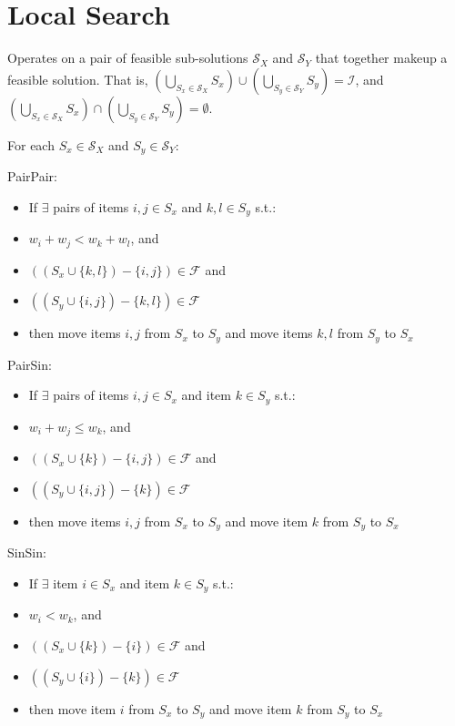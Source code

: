 \documentclass{elsarticle}
\begin{document}
\section{Local Search}
Operates on a pair of feasible sub-solutions $\mathcal{S}_X$ and $\mathcal{S}_Y$ that together makeup a feasible solution. That is, $(\bigcup_{S_x \in \mathcal{S}_X} S_x) \cup (\bigcup_{S_y \in \mathcal{S}_Y} S_y) = \mathcal{I}$, and $(\bigcup_{S_x \in \mathcal{S}_X} S_x) \cap (\bigcup_{S_y \in \mathcal{S}_Y} S_y) = \emptyset$.

For each $S_x \in \mathcal{S}_X$ and $S_y \in \mathcal{S}_Y$:

PairPair:
\begin{itemize}
	\item If $\exists$ pairs of items $i,j \in S_x$ and $k, l \in S_y$ s.t.:
	\item $w_i + w_j < w_k + w_l$, and
	\item $((S_x \cup \{k, l\}) - \{i, j\}) \in \mathcal{F}$ and
	\item $((S_y \cup \{i, j\}) - \{k, l\}) \in \mathcal{F}$
	\item then move items $i, j$ from $S_x$ to $S_y$ and move items $k, l$ from $S_y$ to $S_x$	
\end{itemize}

PairSin:
\begin{itemize}
	\item If $\exists$ pairs of items $i,j \in S_x$ and item $k \in S_y$ s.t.:
	\item $w_i + w_j \leq w_k$, and
	\item $((S_x \cup \{k\}) - \{i, j\}) \in \mathcal{F}$ and
	\item $((S_y \cup \{i, j\}) - \{k\}) \in \mathcal{F}$
	\item then move items $i, j$ from $S_x$ to $S_y$ and move item $k$ from $S_y$ to $S_x$	
\end{itemize}

SinSin:
\begin{itemize}
	\item If $\exists$ item $i \in S_x$ and item $k \in S_y$ s.t.:
	\item $w_i < w_k$, and
	\item $((S_x \cup \{k\}) - \{i\}) \in \mathcal{F}$ and
	\item $((S_y \cup \{i\}) - \{k\}) \in \mathcal{F}$
	\item then move item $i$ from $S_x$ to $S_y$ and move item $k$ from $S_y$ to $S_x$	
\end{itemize}
\end{document}
